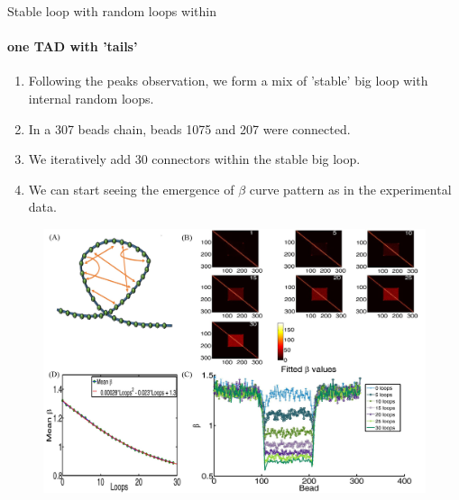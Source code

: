 \documentclass[8pt]{beamer}
\begin{document}
\begin{frame}{Stable loop with random loops within}
\framesubtitle{one TAD with 'tails'}
\begin{enumerate}
\item Following the peaks observation, we form a mix of 'stable' big loop with internal random loops.
\item In a 307 beads chain, beads 1075 and 207 were connected.
\item We iteratively add 30 connectors within the stable big loop.
\item We can start seeing the emergence of $\beta$ curve pattern as in the experimental data.
\end{enumerate}
\begin{figure}[H]
\includegraphics[scale=0.35]{Figure03_OneTADWithTails0To30RandomLoops}
\end{figure}
\end{frame}
\end{document}
